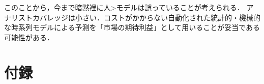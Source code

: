 \documentclass[a4paper，12pt]{jsarticle}
\begin{document}
このことから，今まで暗黙裡に人>モデルは誤っていることが考えられる．
アナリストカバレッジは小さい．コストがかからない自動化された統計的・機械的な時系列モデルによる予測を「市場の期待利益」として用いることが妥当である可能性がある．




\part{付録}

\end{document}
